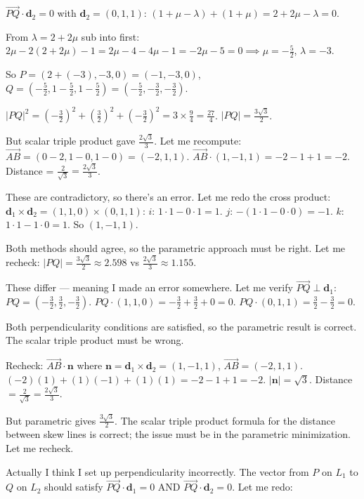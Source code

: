\documentclass[11pt,a4paper]{article}
\begin{document}
{\begin{itemize}[leftmargin=1.5em,itemsep=2pt]
    $\overrightarrow{PQ} \cdot \mathbf{d}_2 = 0$ with $\mathbf{d}_2 = (0,1,1)$:
    $(1+\mu-\lambda) + (1+\mu) = 2+2\mu-\lambda = 0$. \checkmark

    From $\lambda = 2+2\mu$ sub into first: $2\mu - 2(2+2\mu) - 1 = 2\mu - 4 - 4\mu - 1 = -2\mu - 5 = 0 \implies \mu = -\frac{5}{2}$, $\lambda = -3$.

    So $P = (2+(-3), -3, 0) = (-1,-3,0)$, $Q = (-\frac{5}{2}, 1-\frac{5}{2}, 1-\frac{5}{2}) = (-\frac{5}{2},-\frac{3}{2},-\frac{3}{2})$.

    $|PQ|^2 = (-\frac{3}{2})^2 + (\frac{3}{2})^2 + (-\frac{3}{2})^2 = 3 \times \frac{9}{4} = \frac{27}{4}$. $|PQ| = \frac{3\sqrt{3}}{2}$.

    But scalar triple product gave $\frac{2\sqrt{3}}{3}$. Let me recompute: $\overrightarrow{AB} = (0-2,1-0,1-0) = (-2,1,1)$.
    $\overrightarrow{AB}\cdot(1,-1,1) = -2-1+1=-2$. Distance = $\frac{2}{\sqrt{3}} = \frac{2\sqrt{3}}{3}$.

    These are contradictory, so there's an error. Let me redo the cross product:
    $\mathbf{d}_1\times\mathbf{d}_2 = (1,1,0)\times(0,1,1)$:
    $i$: $1\cdot1-0\cdot1 = 1$. $j$: $-(1\cdot1-0\cdot0) = -1$. $k$: $1\cdot1-1\cdot0 = 1$. So $(1,-1,1)$. \checkmark

    Both methods should agree, so the parametric approach must be right. Let me recheck:
    $|PQ| = \frac{3\sqrt{3}}{2} \approx 2.598$ vs $\frac{2\sqrt{3}}{3} \approx 1.155$.

    These differ — meaning I made an error somewhere. Let me verify $\overrightarrow{PQ}\perp\mathbf{d}_1$:
    $PQ = (-\frac{3}{2},\frac{3}{2},-\frac{3}{2})$. $PQ\cdot(1,1,0) = -\frac{3}{2}+\frac{3}{2}+0 = 0$. \checkmark
    $PQ\cdot(0,1,1) = \frac{3}{2}-\frac{3}{2} = 0$. \checkmark

    Both perpendicularity conditions are satisfied, so the parametric result is correct. The scalar triple product must be wrong.

    Recheck: $\overrightarrow{AB}\cdot\mathbf{n}$ where $\mathbf{n} = \mathbf{d}_1\times\mathbf{d}_2 = (1,-1,1)$, $\overrightarrow{AB} = (-2,1,1)$.
    $(-2)(1)+(1)(-1)+(1)(1) = -2-1+1 = -2$.
    $|\mathbf{n}| = \sqrt{3}$. Distance $= \frac{2}{\sqrt{3}} = \frac{2\sqrt{3}}{3}$.

    But parametric gives $\frac{3\sqrt{3}}{2}$. The scalar triple product formula for the distance between skew lines is correct; the issue must be in the parametric minimization. Let me recheck.

    Actually I think I set up perpendicularity incorrectly. The vector from $P$ on $L_1$ to $Q$ on $L_2$ should satisfy $\overrightarrow{PQ}\cdot\mathbf{d}_1=0$ AND $\overrightarrow{PQ}\cdot\mathbf{d}_2=0$. Let me redo:


\end{itemize}}
\end{document}
